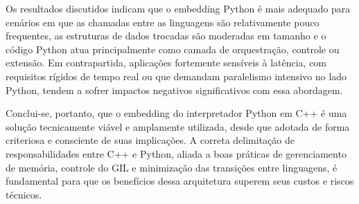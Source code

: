 Os resultados discutidos indicam que o embedding Python é mais adequado para cenários em que as chamadas entre as linguagens são relativamente pouco frequentes, as estruturas de dados trocadas são moderadas em tamanho e o código Python atua principalmente como camada de orquestração, controle ou extensão. Em contrapartida, aplicações fortemente sensíveis à latência, com requisitos rígidos de tempo real ou que demandam paralelismo intensivo no lado Python, tendem a sofrer impactos negativos significativos com essa abordagem.

Conclui-se, portanto, que o embedding do interpretador Python em C++ é uma solução tecnicamente viável e amplamente utilizada, desde que adotada de forma criteriosa e consciente de suas implicações. A correta delimitação de responsabilidades entre C++ e Python, aliada a boas práticas de gerenciamento de memória, controle do GIL e minimização das transições entre linguagens, é fundamental para que os benefícios dessa arquitetura superem seus custos e riscos técnicos.


